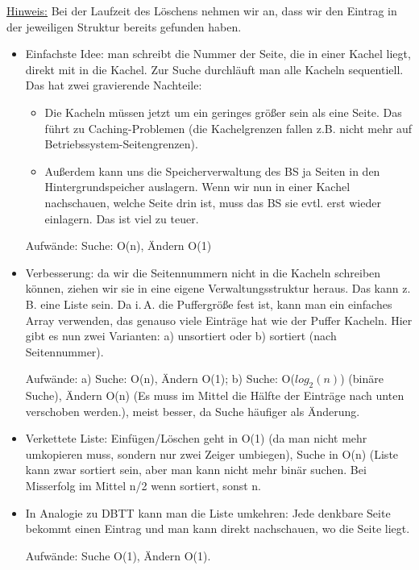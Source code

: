\begin{solution}
\underline{Hinweis:} Bei der Laufzeit des Löschens nehmen wir an, dass wir den Eintrag in der jeweiligen Struktur bereits gefunden haben.
\begin{itemize}
	\item Einfachste Idee: man schreibt die Nummer der Seite, die in einer Kachel liegt, direkt mit in die Kachel. Zur Suche durchläuft man alle Kacheln sequentiell. Das hat zwei gravierende Nachteile:
	\begin{itemize}
		\item Die Kacheln müssen jetzt um ein geringes größer sein als eine Seite. Das führt zu Caching-Problemen (die Kachelgrenzen fallen z.B. nicht mehr auf Betriebssystem-Seitengrenzen).

		\item Außerdem kann uns die Speicherverwaltung des BS ja Seiten in den Hintergrundspeicher auslagern. Wenn wir nun in einer Kachel nachschauen, welche Seite drin ist, muss das BS sie evtl. erst wieder einlagern. Das ist viel zu teuer.
	\end{itemize}
	Aufwände: Suche: O(n), Ändern O(1)

	\item Verbesserung: da wir die Seitennummern nicht in die Kacheln schreiben können, ziehen wir sie in eine eigene Verwaltungsstruktur heraus. Das kann z.\,B. eine Liste sein. Da i.\,A. die Puffergröße fest ist, kann man ein einfaches Array verwenden, das genauso viele Einträge hat wie der Puffer Kacheln. Hier gibt es nun zwei Varianten: a) unsortiert oder b) sortiert (nach Seitennummer).

	Aufwände: a) Suche: O(n), Ändern O(1); b) Suche: O($log_2(n)$) (binäre Suche), Ändern O(n) (Es muss im Mittel die Hälfte der Einträge nach unten verschoben werden.), meist besser, da Suche häufiger als Änderung.

	\item Verkettete Liste: Einfügen/Löschen geht in O(1) (da man nicht mehr umkopieren muss, sondern nur zwei Zeiger umbiegen), Suche in O(n) (Liste kann zwar sortiert sein, aber man kann nicht mehr binär suchen. Bei Misserfolg im Mittel n/2 wenn sortiert, sonst n.

	\item In Analogie zu DBTT kann man die Liste umkehren: Jede denkbare Seite bekommt einen Eintrag und man kann direkt nachschauen, wo die Seite liegt.

	Aufwände: Suche O(1), Ändern O(1).


\end{itemize}
\end{solution}
